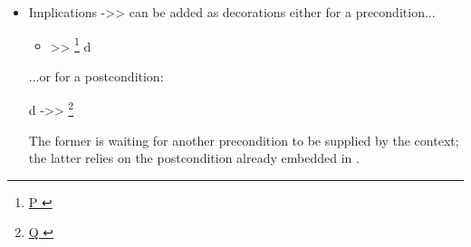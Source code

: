 \documentclass[12pt]{report}
\begin{document}
\begin{itemize}
\item  Implications ->> can be added as decorations either for a
      precondition...



\begin{itemize}
\item >> \footnote{\url{ P }} d



\end{itemize}
      ...or for a postcondition:


      d ->> \footnote{\url{ Q }}


      The former is waiting for another precondition to be supplied by
      the context; the latter relies on the postcondition already
      embedded in . 
\end{itemize}
\end{document}
